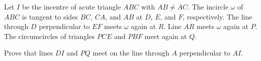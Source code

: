 Let $I$ be the incentre of acute triangle $ABC$ with $AB\neq AC$. The incircle $\omega$ of $ABC$ is tangent to sides $BC$, $CA$, and $AB$ at $D$, $E$, and $F$, respectively. The line through $D$ perpendicular to $EF$ meets $\omega$ again at $R$. Line $AR$ meets $\omega$ again at $P$. The circumcircles of triangles $PCE$ and $PBF$ meet again at $Q$.

Prove that lines $DI$ and $PQ$ meet on the line through $A$ perpendicular to $AI$.